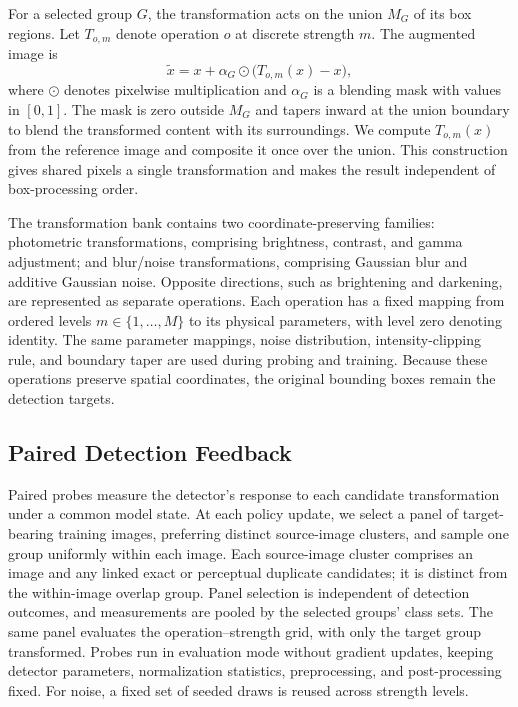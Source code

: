 \documentclass[conference]{IEEEtran}
\begin{document}
For a selected group $G$, the transformation acts on the union $M_G$ of its box regions. Let $T_{o,m}$ denote operation $o$ at discrete strength $m$. The augmented image is
\begin{equation}
    \widetilde{x}=x+\alpha_G\odot\bigl(T_{o,m}(x)-x\bigr),
    \label{eq:local_edit}
\end{equation}
where $\odot$ denotes pixelwise multiplication and $\alpha_G$ is a blending mask with values in $[0,1]$. The mask is zero outside $M_G$ and tapers inward at the union boundary to blend the transformed content with its surroundings. We compute $T_{o,m}(x)$ from the reference image and composite it once over the union. This construction gives shared pixels a single transformation and makes the result independent of box-processing order.

The transformation bank contains two coordinate-preserving families: photometric transformations, comprising brightness, contrast, and gamma adjustment; and blur/noise transformations, comprising Gaussian blur and additive Gaussian noise. Opposite directions, such as brightening and darkening, are represented as separate operations. Each operation has a fixed mapping from ordered levels $m\in\{1,\ldots,M\}$ to its physical parameters, with level zero denoting identity. The same parameter mappings, noise distribution, intensity-clipping rule, and boundary taper are used during probing and training. Because these operations preserve spatial coordinates, the original bounding boxes remain the detection targets.

\subsection{Paired Detection Feedback}
\label{sec:method_feedback}
Paired probes measure the detector's response to each candidate transformation under a common model state. At each policy update, we select a panel of target-bearing training images, preferring distinct source-image clusters, and sample one group uniformly within each image. Each source-image cluster comprises an image and any linked exact or perceptual duplicate candidates; it is distinct from the within-image overlap group. Panel selection is independent of detection outcomes, and measurements are pooled by the selected groups' class sets. The same panel evaluates the operation--strength grid, with only the target group transformed. Probes run in evaluation mode without gradient updates, keeping detector parameters, normalization statistics, preprocessing, and post-processing fixed. For noise, a fixed set of seeded draws is reused across strength levels.
\end{document}
